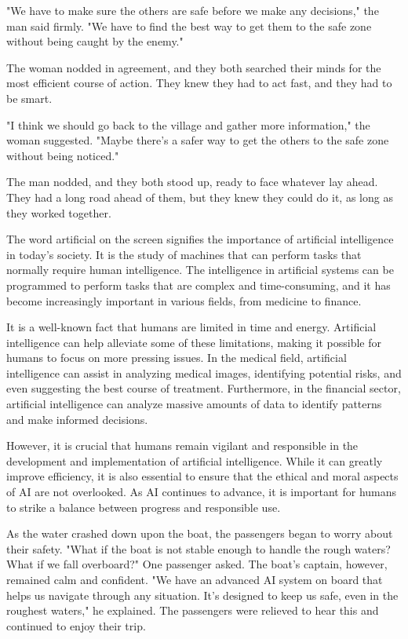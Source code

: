 \documentclass[smalldemyvopaper,11pt,twoside,onecolumn,openright,extrafontsizes]{memoir}
\begin{document}
"We have to make sure the others are safe before we make any decisions," the man said firmly. "We have to find the best way to get them to the safe zone without being caught by the enemy."\par
The woman nodded in agreement, and they both searched their minds for the most efficient course of action. They knew they had to act fast, and they had to be smart.\par
"I think we should go back to the village and gather more information," the woman suggested. "Maybe there's a safer way to get the others to the safe zone without being noticed."\par
The man nodded, and they both stood up, ready to face whatever lay ahead. They had a long road ahead of them, but they knew they could do it, as long as they worked together.\par
The word artificial on the screen signifies the importance of artificial intelligence in today's society. It is the study of machines that can perform tasks that normally require human intelligence. The intelligence in artificial systems can be programmed to perform tasks that are complex and time-consuming, and it has become increasingly important in various fields, from medicine to finance.\par
It is a well-known fact that humans are limited in time and energy. Artificial intelligence can help alleviate some of these limitations, making it possible for humans to focus on more pressing issues. In the medical field, artificial intelligence can assist in analyzing medical images, identifying potential risks, and even suggesting the best course of treatment. Furthermore, in the financial sector, artificial intelligence can analyze massive amounts of data to identify patterns and make informed decisions.\par
However, it is crucial that humans remain vigilant and responsible in the development and implementation of artificial intelligence. While it can greatly improve efficiency, it is also essential to ensure that the ethical and moral aspects of AI are not overlooked. As AI continues to advance, it is important for humans to strike a balance between progress and responsible use.\par
As the water crashed down upon the boat, the passengers began to worry about their safety. "What if the boat is not stable enough to handle the rough waters? What if we fall overboard?" One passenger asked. The boat's captain, however, remained calm and confident. "We have an advanced AI system on board that helps us navigate through any situation. It's designed to keep us safe, even in the roughest waters," he explained. The passengers were relieved to hear this and continued to enjoy their trip.\par
\end{document}
